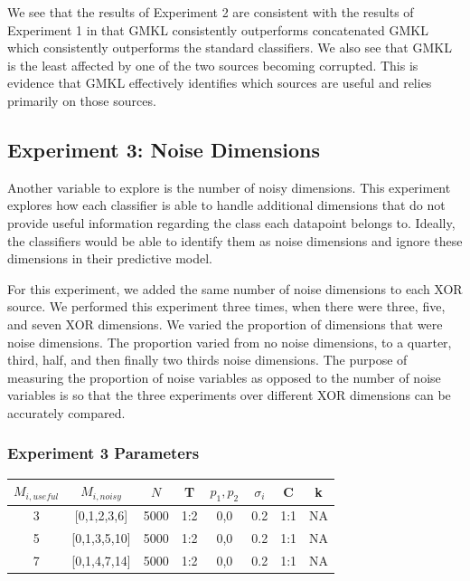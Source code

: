 \documentclass{article}
\begin{document}
We see that the results of Experiment 2 are consistent with the results of
Experiment 1 in that GMKL consistently outperforms concatenated GMKL which
consistently outperforms the standard classifiers. We also see that GMKL is the
least affected by one of the two sources becoming corrupted. This is evidence
that GMKL effectively identifies which sources are useful and relies primarily
on those sources.



\subsection*{Experiment 3: Noise Dimensions}

Another variable to explore is the number of noisy dimensions. This experiment
explores how each classifier is able to handle additional dimensions that do
not provide useful information regarding the class each datapoint belongs to.
Ideally, the classifiers would be able to identify them as noise dimensions and
ignore these dimensions in their predictive model.

For this experiment, we added the same number of noise dimensions to each XOR
source. We performed this experiment three times, when there were three, five,
and seven XOR dimensions. We varied the proportion of dimensions that were
noise dimensions. The proportion varied from no noise dimensions, to a quarter,
third, half, and then finally two thirds noise dimensions. The purpose of
measuring the proportion of noise variables as opposed to the number of noise
variables is so that the three experiments over different XOR dimensions can be
accurately compared.


\subsubsection*{Experiment 3 Parameters}
\begin{center}
\begin{tabular}{|c|c|c|c|c|c|c|c|}
\hline
$M_{i,useful}$ & $M_{i, noisy}$ & $N$ & T &  $p_1, p_2$ & $\sigma_i$ & C &  k  \\
\hline
3& [0,1,2,3,6] & 5000 &1:2 & 0,0 & 0.2 & 1:1 & NA  \\
\hline
5& [0,1,3,5,10] & 5000 &1:2 & 0,0 & 0.2 & 1:1 & NA  \\
\hline
7& [0,1,4,7,14] & 5000 &1:2 & 0,0 & 0.2 & 1:1 & NA  \\
\hline
\end{tabular}
\end{center}
\end{document}
